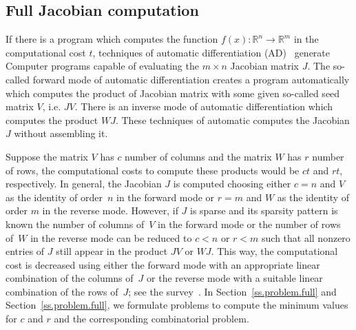 \documentclass[12pt, twoside,a4paper,toc=bibliography]{scrbook}
\newcommand{\secref}[1]{Section~\protect\ref{#1}}
\newcommand{\setR}{\ensuremath{\mathbb{R}}}
\newcommand{\col}{\ensuremath{c}}
\newcommand{\row}{\ensuremath{r}}
\begin{document}
\subsection{Full Jacobian computation}
\label{s.full.jac}
If there is a program which computes the function $f(x) : \setR^n \rightarrow \setR^m$
in the computational cost $t$,
techniques of automatic differentiation (AD)~\cite{Griewank2008EDP,Rall1981ADT} generate
Computer programs capable of evaluating the $m \times n$ Jacobian matrix $J$.
The so-called forward mode of automatic differentiation creates a program automatically
which computes the product of Jacobian matrix with some given so-called seed matrix $V$,
i.e. $JV$. There is an inverse mode of automatic differentiation which computes the product $WJ$.
These techniques of automatic computes the Jacobian $J$ without assembling it.

Suppose the matrix $V$ has $\col$ number of columns and the matrix $W$ has $\row$ number of rows,
the computational costs to compute these products would be $\col t$ and $\row t$, respectively.
In general, the Jacobian $J$ is computed choosing either $c=n$ and $V$ as the identity of
order~$n$ in the forward mode or $r = m$ and $W$ as the identity of order $m$ in the
reverse mode. However, if $J$ is sparse and its sparsity pattern is known the number of
columns of~$V$ in the forward mode or the number of rows of~$W$ in the reverse mode can
be reduced to $\col < n$ or $\row < m$ such that all nonzero entries of $J$ still appear
in the product $JV$ or $WJ$. This way, the computational cost is decreased using either
the forward mode with an appropriate linear combination of the columns of~$J$ or the reverse
mode with a suitable linear combination of the rows of~$J$; see the
survey~\cite{Gebremedhin05whatcolor}.
In \secref{ss.problem.full} and \secref{ss.problem.full}, we formulate problems to compute the
minimum values for $\col$ and $\row$ and the corresponding combinatorial problem.
\end{document}
